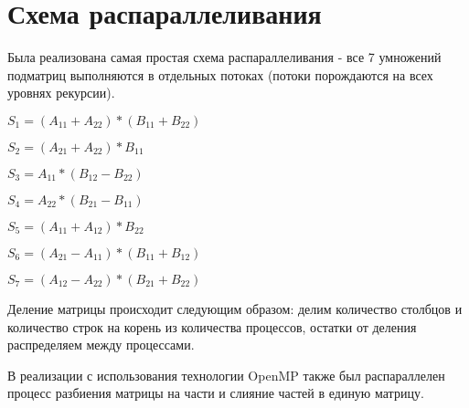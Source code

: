 \documentclass{report}
\begin{document}
\newpage

\section*{Схема распараллеливания}
Была реализована самая простая схема распараллеливания - все 7 умножений подматриц выполняются в отдельных потоках (потоки порождаются на всех уровнях рекурсии).
\par
\begin{center} 
$S_1=(A_{11}+A_{22})*(B_{11}+B_{22})$

$S_2=(A_{21}+A_{22})*B_{11}$

$S_3=A_{11}*(B_{12}-B_{22})$

$S_4=A_{22}*(B_{21}-B_{11})$

$S_5=(A_{11}+A_{12})*B_{22}$

$S_6=(A_{21}-A_{11})*(B_{11}+B_{12})$

$S_7=(A_{12}-A_{22})*(B_{21}+B_{22})$
\end{center}
Деление матрицы происходит следующим образом: делим количество столбцов и количество строк на корень из количества процессов, остатки от деления распределяем между процессами.
\par
В реализации с использования технологии OpenMP также был распараллелен процесс разбиения матрицы на части и слияние частей в единую матрицу.
\newpage

\end{document}
